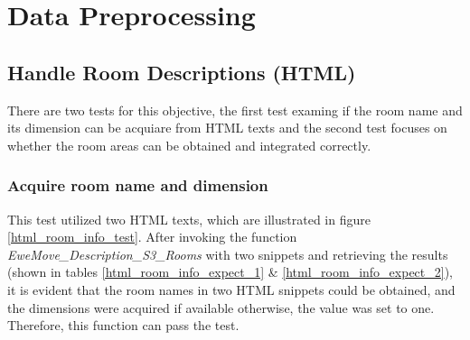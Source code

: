 \documentclass[12pt,twoside]{report}
\begin{document}
\section{Data Preprocessing}

\subsection{Handle Room Descriptions (HTML)}
There are two tests for this objective, the first test examing if the room name and its dimension can be acquiare from HTML texts and the second test focuses on whether the room areas can be obtained and integrated correctly. 

\subsubsection{Acquire room name and dimension}
This test utilized two HTML texts, which are illustrated in figure \ref{html_room_info_test}. After invoking the function \textit{EweMove\_Description\_S3\_Rooms} with two snippets and retrieving the results (shown in tables \ref{html_room_info_expect_1} \& \ref{html_room_info_expect_2}), it is evident that the room names in two HTML snippets could be obtained, and the dimensions were acquired if available otherwise, the value was set to one. Therefore, this function can pass the test.
\end{document}
